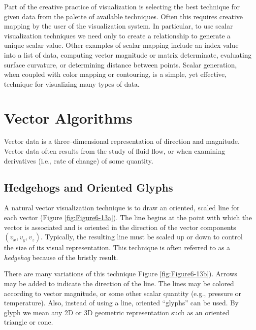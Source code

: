 Part of the creative practice of visualization is selecting the best technique for given data from the palette of available techniques. Often this requires creative mapping by the user of the visualization system. In particular, to use scalar visualization techniques we need only to create a relationship to generate a unique scalar value. Other examples of scalar mapping include an index value into a list of data, computing vector magnitude or matrix determinate, evaluating surface curvature, or determining distance between points. Scalar generation, when coupled with color mapping or contouring, is a simple, yet effective, technique for visualizing many types of data.

\section{Vector Algorithms}

Vector data is a three--dimensional representation of direction and magnitude. Vector data often results from the study of fluid flow, or when examining derivatives (i.e., rate of change) of some quantity.

\subsection{Hedgehogs and Oriented Glyphs}
\label{subsec:hedgehogs_oriented_glyphs}

A natural vector visualization technique is to draw an oriented,
scaled line for each vector (Figure \ref{fig:Figure6-13a}). The line begins at the point with which the vector is associated and is oriented in the direction of the vector components $(v_x, v_y, v_z)$. Typically, the resulting line must be scaled up or down to control the size of its visual representation. This technique is often referred to as a \emph{hedgehog} because of the bristly result.

There are many variations of this technique Figure \ref{fig:Figure6-13b}). Arrows may be added to indicate the direction of the line. The lines may be colored according to vector magnitude, or some other scalar quantity (e.g., pressure or temperature). Also, instead of using a line, oriented ``glyphs'' can be used. By glyph we mean any 2D or 3D geometric representation such as an oriented triangle or cone.

